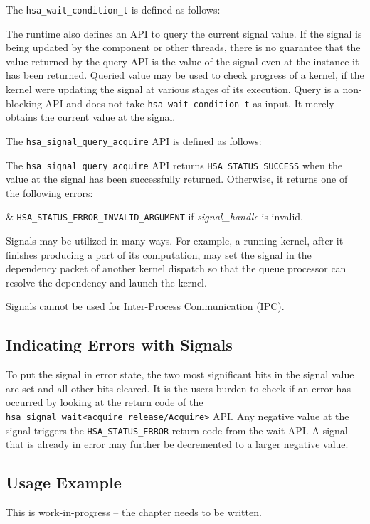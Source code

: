 The \texttt{hsa\_wait\_condition\_t} is defined as follows:



The runtime also defines an API to query the current signal value.
If the signal is being updated by the component or other threads,
there is no guarantee that the value returned by the query API is
the value of the signal even at the instance it has been returned.
Queried value may be used to check progress of a kernel, if the
kernel were updating the signal at various stages of its execution.
Query is a non-blocking API and does not take
\texttt{hsa\_wait\_condition\_t} as input. It merely obtains the
current value at the signal.

The \texttt{hsa\_signal\_query\_acquire} API is defined as follows:

 

The \texttt{hsa\_signal\_query\_acquire} API returns
\texttt{HSA\_STATUS\_SUCCESS} when the value at the signal has been
successfully returned. Otherwise, it returns one of the following
errors:

\begin{easylist}
& \texttt{HSA\_STATUS\_ERROR\_INVALID\_ARGUMENT} if {\itshape
signal\_handle} is invalid.
\end{easylist}

Signals may be utilized in many ways. For example, a running kernel,
after it finishes producing a part of its computation, may set the
signal in the dependency packet of another kernel dispatch so that
the queue processor can resolve the dependency and launch the kernel.

Signals cannot be used for Inter-Process Communication (IPC).

\hypertarget{signal_error}{} \subsection{ Indicating Errors with
Signals} \label{signal_error}
To put the signal in error state, the two most significant bits in
the signal value are set and all other bits cleared. It is the users
burden to check if an error has occurred by looking at the
return code of the
\texttt{hsa\_signal\_wait<acquire\_release/Acquire>} API. Any
negative value at the signal triggers the
\texttt{HSA\_STATUS\_ERROR} return code from the wait API. A signal
that is already in error may further be decremented to a larger
negative value. 

\hypertarget{signal_example}{} \subsection{Usage Example}
This is {\color{red} work-in-progress} -- the chapter needs to be written.
\label{signal_example}
